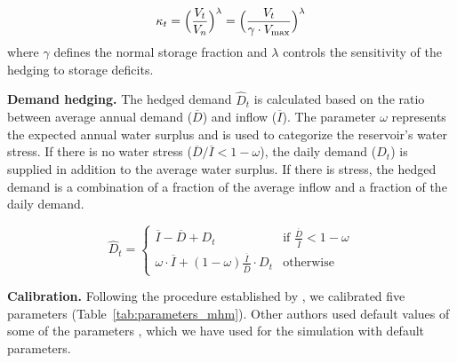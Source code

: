 \documentclass[hess, manuscript]{copernicus}
\begin{document}
\begin{equation}
\label{eq:mhm_kappa}
    \kappa_t = \Bigl( \frac{V_t}{V_n} \Bigr)^\lambda = \Bigl( \frac{V_t}{\gamma \cdot V_{\max}} \Bigr)^\lambda
\end{equation}
where $\gamma$ defines the normal storage fraction and $\lambda$ controls the sensitivity of the hedging to storage deficits.

\medskip
\textbf{Demand hedging.} The hedged demand $\hat{D}_t$ is calculated based on the ratio between average annual demand ($\overline{D}$) and inflow ($\overline{I}$). The parameter $\omega$ represents the expected annual water surplus and is used to categorize the reservoir's water stress. If there is no water stress ($\overline{D}/\overline{I} < 1 - \omega$), the daily demand ($D_t$) is supplied in addition to the average water surplus. If there is stress, the hedged demand is a combination of a fraction of the average inflow and a fraction of the daily demand.

\begin{equation}
\label{eq:hedged_demand}
    \hat{D}_t =
    \begin{cases}
        \overline{I} - \overline{D} + D_t  & \text{if } \frac{\overline{D}}{\overline{I}} < 1 - \omega \\
        \omega \cdot \overline{I} + (1 - \omega) \frac{\overline{I}}{\overline{D}} \cdot D_t & \text{otherwise}        
    \end{cases}
\end{equation}

\medskip
\textbf{Calibration.} Following the procedure established by \citet{Shrestha2024}, we calibrated five parameters (Table~\ref{tab:parameters_mhm}). Other authors used default values of some of the parameters \citep{Hanasaki2006, Shin2019, Sadki2023}, which we have used for the simulation with default parameters.
\end{document}
